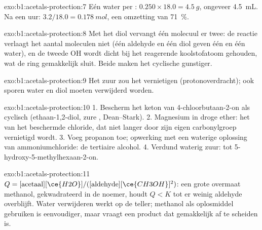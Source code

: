 \begin{solution}{exo:b1:acetals-protection:7}
Eén water per : $0.250 \times 18.0 = \qty{4.5}{g}$, ongeveer
\qty{4.5}{mL}. Na een uur: $3.2/18.0 = \qty{0.178}{mol}$, een omzetting van
\qty{71}{\percent}.
\end{solution}

\begin{solution}{exo:b1:acetals-protection:8}
Met het diol vervangt één molecuul er twee: de reactie verlaagt het
aantal moleculen niet (één aldehyde en één diol geven één  en één
water), en de tweede OH wordt dicht bij het reagerende koolstofatoom
gehouden, wat de ring gemakkelijk sluit. Beide maken het cyclische
 gunstiger.
\end{solution}

\begin{solution}{exo:b1:acetals-protection:9}
Het zuur zou het  vernietigen (protonoverdracht); ook
sporen water en diol moeten verwijderd worden.
\end{solution}

\begin{solution}{exo:b1:acetals-protection:10}
1. Bescherm het keton van 4-chloorbutaan-2-on als cyclisch 
(ethaan-1,2-diol, zure , Dean--Stark). 2. Magnesium in droge
ether: het  van het beschermde chloride, dat niet langer
door zijn eigen carbonylgroep vernietigd wordt. 3. Voeg propanon toe;
opwerking met een waterige oplossing van ammoniumchloride: de tertiaire
alcohol. 4. Verdund waterig zuur:  tot
5-hydroxy-5-methylhexaan-2-on.
\end{solution}

\begin{solution}{exo:b1:acetals-protection:11}
$Q = [\text{acetaal}][\ce{H2O}]/([\text{aldehyde}][\ce{CH3OH}]^2)$: een
grote overmaat methanol, gekwadrateerd in de noemer, houdt $Q < K$ tot er
weinig aldehyde overblijft. Water verwijderen werkt op de teller;
methanol als oplosmiddel gebruiken is eenvoudiger, maar vraagt een
product dat gemakkelijk af te scheiden is.
\end{solution}

